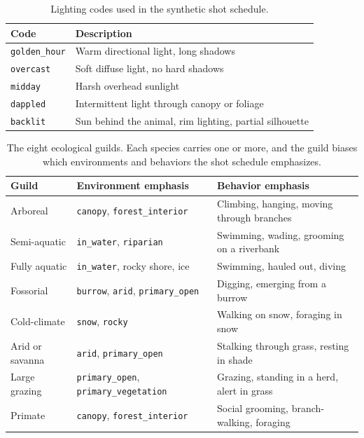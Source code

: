\begin{table}[htbp]
\centering
\caption{Lighting codes used in the synthetic shot schedule.}
\label{tab:appendix-lighting-codes}
\begin{tabularx}{\textwidth}{@{}lX@{}}
\toprule
Code & Description \\
\midrule
\texttt{golden\_hour} & Warm directional light, long shadows \\
\texttt{overcast} & Soft diffuse light, no hard shadows \\
\texttt{midday} & Harsh overhead sunlight \\
\texttt{dappled} & Intermittent light through canopy or foliage \\
\texttt{backlit} & Sun behind the animal, rim lighting, partial silhouette \\
\bottomrule
\end{tabularx}
\end{table}

\begin{table}[htbp]
\centering
\caption[Ecological guilds biasing the environment and behavior axes]{The eight ecological guilds. Each species carries one or more, and the guild biases which environments and behaviors the shot schedule emphasizes.}
\label{tab:appendix-guilds}
\begin{tabularx}{\textwidth}{@{}lXX@{}}
\toprule
Guild & Environment emphasis & Behavior emphasis \\
\midrule
Arboreal & \texttt{canopy}, \texttt{forest\_interior} & Climbing, hanging, moving through branches \\
Semi-aquatic & \texttt{in\_water}, \texttt{riparian} & Swimming, wading, grooming on a riverbank \\
Fully aquatic & \texttt{in\_water}, rocky shore, ice & Swimming, hauled out, diving \\
Fossorial & \texttt{burrow}, \texttt{arid}, \texttt{primary\_open} & Digging, emerging from a burrow \\
Cold-climate & \texttt{snow}, \texttt{rocky} & Walking on snow, foraging in snow \\
Arid or savanna & \texttt{arid}, \texttt{primary\_open} & Stalking through grass, resting in shade \\
Large grazing & \texttt{primary\_open}, \texttt{primary\_vegetation} & Grazing, standing in a herd, alert in grass \\
Primate & \texttt{canopy}, \texttt{forest\_interior} & Social grooming, branch-walking, foraging \\
\bottomrule
\end{tabularx}
\end{table}

